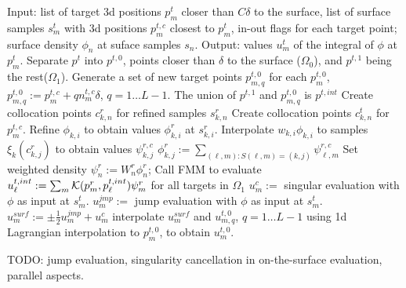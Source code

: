 \documentclass[10pt]{article}
\newcommand{\cK}{{\cal K}}
\begin{document}
\begin{algorithmic}
\STATE{}
\STATE Input: list of target 3d positions $p^t_m$ closer than $C\delta$ to the
surface, list of surface samples  $s^t_m$ with 3d positions $p^{t,c}_m$ closest to $p^t_m$,
  in-out flags for each target point; 
  surface density $\phi_n$ at suface samples $s_n$. Output: values $u^t_m$ of the integral of $\phi$ at $p^t_m$.
  \STATE {}
\STATE Separate $p^t$ into $p^{t,0}$, points closer than $\delta$ to the surface ($\Omega_0$), and $p^{t,1}$ being the rest($\Omega_1$).
\STATE Generate  a set of new target points $p^{t,0}_{m,q}$ for each $p^{t,0}_m$, $p^{t,0}_{m,q} := p^{t,c}_m + q n^{t,c}_m \delta$, $q = 1\ldots L-1$.
\STATE The union of $p^{t,1}$ and $p^{t,0}_{m,q}$ is $p^{t,int}$														  
\STATE Create collocation points $c^r_{k,n}$ for refined samples $s^r_{k,n}$
\STATE {}
\STATE Create collocation points $c^t_{k,n}$ for $p^{t,c}_m$.
\STATE{}						      
\STATE Refine $\phi_{k,i}$  to obtain values $\phi^r_{k,i}$ at  $s^r_{k,i}$.
\STATE Interpolate $w_{k,i}\phi_{k,i}$ to samples $\xi_k(c^r_{k,j})$ to obtain values $\psi^{r,c}_{k,j}$
\ENDFOR
\ENDFOR
{}
\STATE $\phi^r_{k,j} := \sum_{(\ell,m): S(\ell,m) = (k,j)} \psi^{r,c}_{\ell,m}$ 
\ENDFOR
\STATE Set weighted density $\psi^r_n := W^r_n \phi^r_n$;
\STATE Call FMM to evaluate $u^{t,int}_\ell := \sum_m \cK(p^r_m,p^{t,int}_\ell)\psi^r_m$ for all targets in $\Omega_1$
  \STATE {}
\STATE $u^{c}_m :=$ singular evaluation with $\phi$ as input at $s^t_m$.
\STATE $u^{jmp}_m :=$  jump evaluation with $\phi$ as input at $s^t_m$.
\STATE $u^{surf}_m := \pm\frac{1}{2} u^{jmp}_m  + u^c_m$ 
\STATE interpolate $u^{surf}_m$ and $u^{t,0}_{m,q}$, $q=1 \ldots L-1$ using 1d Lagrangian interpolation to $p^{t,0}_m$, to obtain $u^{t,0}_m$.
\ENDFOR
\end{algorithmic}

TODO:  jump evaluation, singularity cancellation in on-the-surface evaluation, parallel aspects. 
\end{document}
